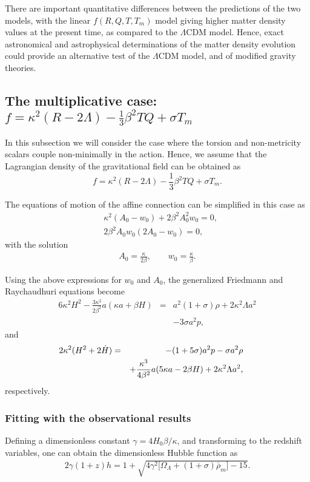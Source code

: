 \documentclass[aps,superscriptaddress, showpacs,preprintnumbers, superscriptaddress, nofootinbibt,twocolumn]{revtex4}
\def\bea{\begin{eqnarray}}
\def\eea{\end{eqnarray}}
\begin{document}
There are important quantitative differences between the predictions of the two models, with the linear $f\left(R,Q,T,T_m\right)$ model giving higher matter density values at the present time, as compared to the $\Lambda$CDM model. Hence, exact astronomical and astrophysical determinations of the matter density evolution could provide an alternative test of the $\Lambda$CDM model, and of modified gravity theories.

\subsection{The multiplicative case: $f=\kappa^2(R-2\Lambda)-\frac13\beta^2T Q+\sigma T_m$}

In this subsection we will consider the case where the torsion and non-metricity scalars couple non-minimally in the action. Hence, we assume that the Lagrangian density of the gravitational field can be obtained as
$$f=\kappa^2(R-2\Lambda)-\frac13\beta^2 T Q+\sigma T_m.$$

The equations of motion of the affine connection can be simplified in this case as
\begin{align}
&\kappa^2(A_0-w_0)+2\beta^2A_0^2w_0=0,\nonumber\\
&2\beta^2A_0w_0(2A_0-w_0)=0,
\end{align}
with the solution
\begin{align}
A_0=\frac{\kappa}{2\beta},\qquad w_0=\frac{\kappa}{\beta}.
\end{align}

Using the above expressions for $w_0$ and $A_0$,  the generalized Friedmann and Raychaudhuri equations become
\bea
6\kappa^2H^2-\frac{3\kappa^2}{2\beta^2}a(\kappa a+\beta H)&=&a^2(1+\sigma)\rho+2\kappa^2\Lambda a^2\nonumber\\
&&-3\sigma a^2 p,
\eea
and
\bea
\hspace{-0.5cm}2\kappa^2(H^2+2\dot{H})&=&-(1+5\sigma)a^2 p-\sigma a^2\rho \nonumber\\
\hspace{-0.5cm}&&+\frac{\kappa^3}{4\beta^2}a(5\kappa a-2\beta H)+2\kappa^2\Lambda a^2,
\eea
respectively.

\subsubsection{Fitting with the observational results}

Defining a dimensionless constant $\gamma=4H_0\beta/\kappa$, and transforming to the redshift variables, one can obtain the dimensionless Hubble function as
\begin{align}
2\gamma(1+z)h=1+\sqrt{4\gamma^2\big[\Omega_\Lambda+(1+\sigma)\bar\rho_m\big]-15}.
\end{align}
\end{document}
